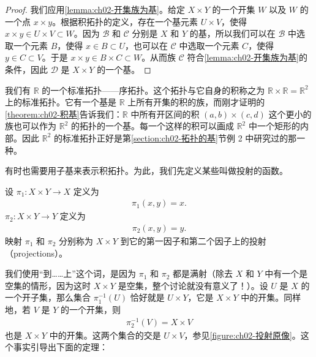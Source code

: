 \documentclass[../../main.tex]{subfiles}
\begin{document}
\begin{proof}
我们应用\cref{lemma:ch02-开集族为基}。给定 $X \times Y$ 的一个开集 $W$ 以及 $W$ 的一个点 $x \times y$。根据积拓扑的定义，存在一个基元素 $U \times V$，使得 $x \times y \in U \times V \subset W$。因为 $\mathcal{B}$ 和 $\mathcal{C}$ 分别是 $X$ 和 $Y$ 的基，所以我们可以在 $\mathcal{B}$ 中选取一个元素 $B$，使得 $x \in B \subset U$，也可以在 $\mathcal{C}$ 中选取一个元素 $C$，使得 $y \in C \subset V$。于是 $x \times y \in B \times C \subset W$。从而族 $\mathcal{C}$ 符合\cref{lemma:ch02-开集族为基}的条件，因此 $\mathcal{D}$ 是 $X \times Y$ 的一个基。
\end{proof}

\begin{example}\label{example:ch02-R标准积}
我们有 $\mathbb{R}$ 的一个标准拓扑——序拓扑。这个拓扑与它自身的积称之为 $\mathbb{R} \times \mathbb{R} = \mathbb{R}^{2}$ 上的标准拓扑。它有一个基是 $\mathbb{R}$ 上所有开集的积的族，而刚才证明的\cref{theorem:ch02-积基}告诉我们：$\mathbb{R}$ 中所有开区间的积 $(a, b) \times (c, d)$ 这个更小的族也可以作为 $\mathbb{R}^{2}$ 的拓扑的一个基。每一个这样的积可以画成 $\mathbb{R}^{2}$ 中一个矩形的内部。因此 $\mathbb{R}^{2}$ 的标准拓扑正好是第\cref{section:ch02-拓扑的基}节例 2 中研究过的那一种。
\end{example}

有时也需要用子基来表示积拓扑。为此，我们先定义某些叫做投射的函数。

\begin{definition}[投射]\label{definition:ch02-投射}
设 $\pi_{1}: X \times Y \rightarrow X$ 定义为
\begin{align*}
\pi_{1}(x, y) = x.
\end{align*}
$\pi_{2}: X \times Y \rightarrow Y$ 定义为
\begin{align*}
\pi_{2}(x, y) = y.
\end{align*}
映射 $\pi_{1}$ 和 $\pi_{2}$ 分别称为 $X \times Y$ 到它的第一因子和第二个因子上的投射（projections）。
\end{definition}

我们使用“到……上”这个词，是因为 $\pi_{1}$ 和 $\pi_{2}$ 都是满射（除去 $X$ 和 $Y$ 中有一个是空集的情形，因为这时 $X \times Y$ 是空集，整个讨论就没有意义了！）。设 $U$ 是 $X$ 的一个开子集，那么集合 $\pi_{1}^{-1}(U)$ 恰好就是 $U \times Y$，它是 $X \times Y$ 中的开集。同样地，若 $V$ 是 $Y$ 的一个开集，则
\begin{align*}
\pi_{2}^{-1}(V) = X \times V
\end{align*}
也是 $X \times Y$ 中的开集。这两个集合的交是 $U \times V$，参见\cref{figure:ch02-投射原像}。这个事实引导出下面的定理：
\end{document}
